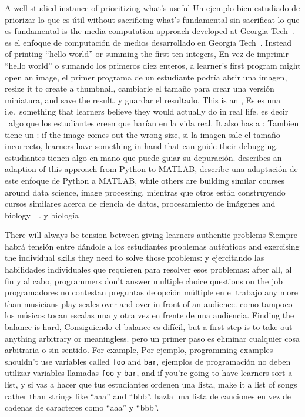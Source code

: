 A well-studied instance of prioritizing what's useful
Un ejemplo bien estudiado de priorizar lo que es útil
without sacrificing what's fundamental
sin sacrificat lo que es fundamental
is the media computation approach developed at Georgia Tech~\cite{Guzd2013}.
es el enfoque de computación de medios desarrollado en Georgia Tech~\cite{Guzd2013}.
Instead of printing ``hello world'' or summing the first ten integers,
En vez de imprimir ``hello world” o sumando los primeros diez enteros,
a learner's first program might open an image,
el primer programa de un estudiante podría abrir una imagen,
resize it to create a thumbnail,
cambiarle el tamaño para crear una versión miniatura,
and save the result.
y guardar el resultado.
This is an ,
Es es una 
i.e.\ something that learners believe they would actually do in real life.
es decir \ algo que los estudiantes creen que harían en la vida real.
It also has a :
Tambien tiene un :
if the image comes out the wrong size,
si la imagen sale el tamaño incorrecto,
learners have something in hand that can guide their debugging.
estudiantes tienen algo en mano que puede guiar su depuración.
\cite{Lee2013} describes an adaption of this approach from Python to MATLAB,
\cite{Lee2013} describe una adaptación de este enfoque de Python a MATLAB,
while others are building similar courses around data science, image processing,
mientras que otros están construyendo cursos similares acerca de ciencia de datos, procesamiento de imágenes
and biology~\cite{Dahl2018,Meys2018,Ritz2018}~\cite{Dahl2018,Meys2018,Ritz2018}.
y biología~\cite{Dahl2018,Meys2018,Ritz2018}

There will always be tension between giving learners authentic problems
Siempre habrá tensión entre dándole a los estudiantes problemas auténticos
and exercising the individual skills they need to solve those problems:
y ejercitando las habilidades individuales que requieren para resolver esos problemas:
after all,
al fin y al cabo,
programmers don't answer multiple choice questions on the job
programadores no contestan preguntas de opción múltiple en el trabajo
any more than musicians play scales over and over in front of an audience.
como tampoco los músicos tocan escalas una y otra vez en frente de una audiencia.
Finding the balance is hard,
Consiguiendo el balance es difícil,
but a first step is to take out anything arbitrary or meaningless.
pero un primer paso es eliminar cualquier cosa arbitraria o sin sentido.
For example,
Por ejemplo,
programming examples shouldn't use variables called \texttt{foo} and \texttt{bar},
ejemplos de programación no deben utilizar variables llamadas \texttt{foo} y \texttt{bar},
and if you're going to have learners sort a list,
y si vas a hacer que tus estudiantes ordenen una lista,
make it a list of songs rather than strings like ``aaa'' and ``bbb''.
hazla una lista de canciones en vez de cadenas de caracteres como ``aaa” y ``bbb”.

